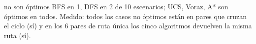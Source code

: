 {no son óptimos BFS en 1, DFS en 2 de 10 escenarios; UCS, Voraz, A* son óptimos en todos.}
{Medido: todos los casos no óptimos están en pares que cruzan el ciclo (sí) y en los 6 pares de ruta única los cinco algoritmos devuelven la misma ruta (sí).}
